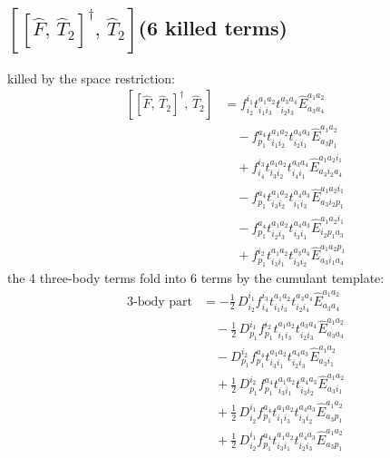 \documentclass[11pt]{article}
\begin{document}
\subsection*{$\left[\left[\hat{F},\, \hat{T}_{2}\right]^{\dagger},\, \hat{T}_{2}\right]$\quad(6 killed terms)}
killed by the space restriction:
\begin{align}
\left[\left[\hat{F},\, \hat{T}_{2}\right]^{\dagger},\, \hat{T}_{2}\right] &= f^{i_{1}}_{i_{2}} t^{a_{1}a_{2}}_{i_{1}i_{3}} t^{a_{3}a_{4}}_{i_{2}i_{3}} \hat{E}^{a_{1}a_{2}}_{a_{3}a_{4}} \\
&\quad - f^{a_{4}}_{p_{1}} t^{a_{1}a_{2}}_{i_{1}i_{2}} t^{a_{4}a_{3}}_{i_{2}i_{1}} \hat{E}^{a_{1}a_{2}}_{a_{3}p_{1}} \\
&\quad + f^{i_{3}}_{i_{4}} t^{a_{1}a_{2}}_{i_{3}i_{2}} t^{a_{3}a_{4}}_{i_{4}i_{1}} \hat{E}^{a_{1}a_{2}i_{1}}_{a_{3}i_{2}a_{4}} \\
&\quad - f^{a_{4}}_{p_{1}} t^{a_{1}a_{2}}_{i_{3}i_{2}} t^{a_{4}a_{3}}_{i_{1}i_{3}} \hat{E}^{a_{1}a_{2}i_{1}}_{a_{3}i_{2}p_{1}} \\
&\quad - f^{a_{4}}_{p_{1}} t^{a_{1}a_{2}}_{i_{2}i_{3}} t^{a_{4}a_{3}}_{i_{3}i_{1}} \hat{E}^{a_{1}a_{2}i_{1}}_{i_{2}p_{1}a_{3}} \\
&\quad + f^{i_{2}}_{p_{1}} t^{a_{1}a_{2}}_{i_{3}i_{1}} t^{a_{3}a_{4}}_{i_{3}i_{2}} \hat{E}^{a_{1}a_{2}p_{1}}_{a_{3}i_{1}a_{4}}
\end{align}
the 4 three-body terms fold into 6 terms by the cumulant template:
\begin{align}
3\text{-body part} &= - \tfrac{1}{2}\, D^{i_{1}}_{i_{2}} f^{i_{3}}_{i_{4}} t^{a_{1}a_{2}}_{i_{1}i_{3}} t^{a_{3}a_{4}}_{i_{2}i_{4}} \hat{E}^{a_{1}a_{2}}_{a_{3}a_{4}} \\
&\quad - \tfrac{1}{2}\, D^{i_{1}}_{p_{1}} f^{i_{2}}_{p_{1}} t^{a_{1}a_{2}}_{i_{1}i_{3}} t^{a_{3}a_{4}}_{i_{2}i_{3}} \hat{E}^{a_{1}a_{2}}_{a_{3}a_{4}} \\
&\quad - D^{i_{2}}_{p_{1}} f^{a_{4}}_{p_{1}} t^{a_{1}a_{2}}_{i_{3}i_{1}} t^{a_{4}a_{3}}_{i_{2}i_{3}} \hat{E}^{a_{1}a_{2}}_{a_{3}i_{1}} \\
&\quad + \tfrac{1}{2}\, D^{i_{2}}_{p_{1}} f^{a_{4}}_{p_{1}} t^{a_{1}a_{2}}_{i_{3}i_{1}} t^{a_{4}a_{3}}_{i_{3}i_{2}} \hat{E}^{a_{1}a_{2}}_{a_{3}i_{1}} \\
&\quad + \tfrac{1}{2}\, D^{i_{1}}_{i_{2}} f^{a_{4}}_{p_{1}} t^{a_{1}a_{2}}_{i_{1}i_{3}} t^{a_{4}a_{3}}_{i_{3}i_{2}} \hat{E}^{a_{1}a_{2}}_{a_{3}p_{1}} \\
&\quad + \tfrac{1}{2}\, D^{i_{1}}_{i_{2}} f^{a_{4}}_{p_{1}} t^{a_{1}a_{2}}_{i_{3}i_{1}} t^{a_{4}a_{3}}_{i_{2}i_{3}} \hat{E}^{a_{1}a_{2}}_{a_{3}p_{1}}
\end{align}
\end{document}
